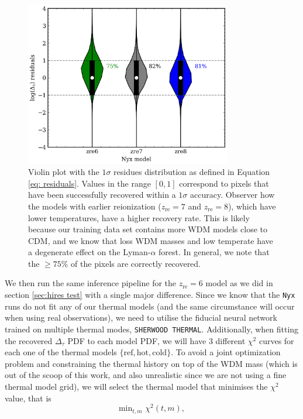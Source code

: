 \begin{figure}
    \centering
    \includegraphics[width=0.8\textwidth]{img/ML/violin_nyx.png}
    \caption{Violin plot with the $1\sigma$ residues distribution as defined in Equation \ref{eq: residuals}. Values in the range $[0,1]$ correspond to pixels that have been successfully recovered within a $1\sigma$ accuracy. Observer how the models with earlier reionization ($z_\mathrm{re}=7$ and $z_\mathrm{re}=8$), which have lower temperatures, have a higher recovery rate. This is likely because our training data set contains more WDM models close to CDM, and we know that loss WDM masses and low temperate have a degenerate effect on the Lyman-$\alpha$ forest. In general, we note that the $\geq 75 \%$ of the pixels are correctly recovered.}
    \label{fig: nyx violin}
\end{figure}
We then run the same inference pipeline for the $z_\mathrm{re}=6$ model as we did in section \ref{sec:hires test} with a single major difference. Since we know that the \texttt{Nyx} runs do not fit any of our thermal models (and the same circumstance will occur when using real observations), we need to utilise the fiducial neural network trained on multiple thermal modes, \texttt{SHERWOOD THERMAL}. Additionally, when fitting the recovered $\Delta_\tau$ PDF to each model PDF, we will have 3 different $\chi^2$ curves for each one of the thermal models $\{\mathrm{ref}, \mathrm{hot}, \mathrm{cold} \}$. To avoid a joint optimization problem and constraining the thermal history on top of the WDM mass (which is out of the scoop of this work, and also unrealistic since we are not using a fine thermal model grid), we will select the thermal model that minimises the $\chi^2$ value, that is
\begin{equation}\label{eq: chi thermal def}
    \mathrm{min}_{t,m} \, \, \chi^2(t,m),
\end{equation}
